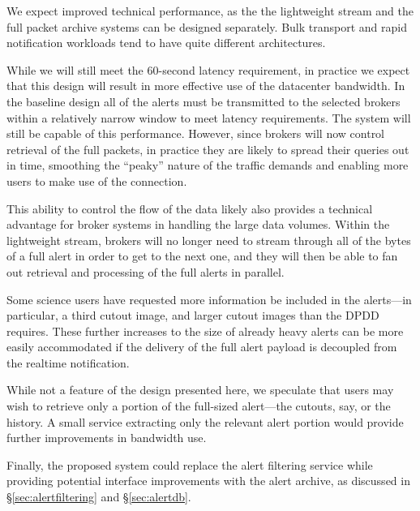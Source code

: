 \documentclass[DM,authoryear,toc]{lsstdoc}
\begin{document}
We expect improved technical performance, as the the lightweight stream and the full packet archive systems can be designed separately.
Bulk transport and rapid notification workloads tend to have quite different architectures.

While we will still meet the 60-second latency requirement, in practice we expect that this design will result in more effective use of the datacenter bandwidth.
In the baseline design all of the alerts must be transmitted to the selected brokers within a relatively narrow window to meet latency requirements.
The system will still be capable of this performance.
However, since brokers will now control retrieval of the full packets, in practice they are likely to spread their queries out in time, smoothing the ``peaky'' nature of the traffic demands and enabling more users to make use of the connection.

This ability to control the flow of the data likely also provides a technical advantage for broker systems in handling the large data volumes.
Within the lightweight stream, brokers will no longer need to stream through all of the bytes of a full alert in order to get to the next one, and they will then be able to fan out retrieval and processing of the full alerts in parallel.

Some science users have requested more information be included in the alerts---in particular, a third cutout image, and larger cutout images than the DPDD requires.
These further increases to the size of already heavy alerts can be more easily accommodated if the delivery of the full alert payload is decoupled from the realtime notification.

While not a feature of the design presented here, we speculate that users may wish to retrieve only a portion of the full-sized alert---the cutouts, say, or the \DIASource history.
A small service extracting only the relevant alert portion would provide further improvements in bandwidth use.

Finally, the proposed system could replace the alert filtering service while providing potential interface improvements with the alert archive, as discussed in \S \ref{sec:alertfiltering} and \S \ref{sec:alertdb}.
\end{document}
